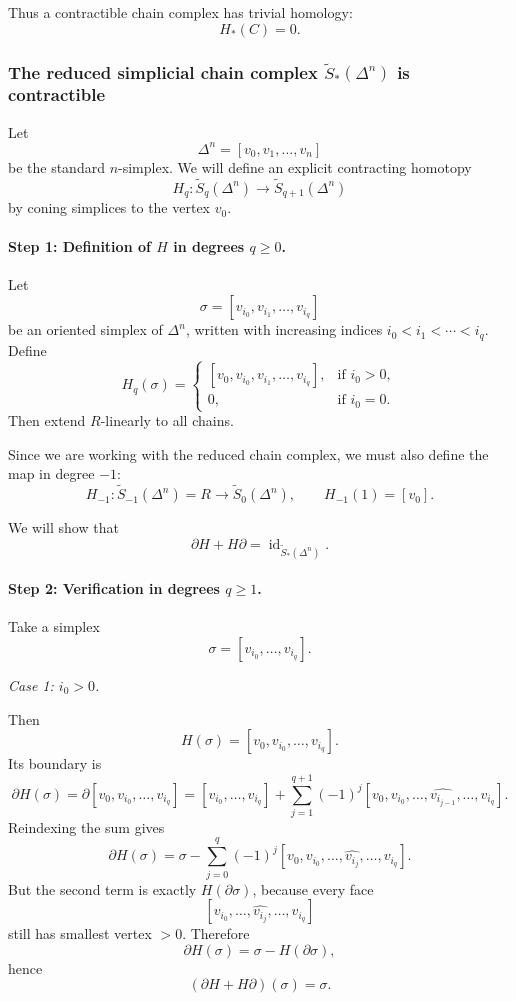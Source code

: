 \documentclass[12pt,a4paper]{article}
\theoremstyle{notespace}
\begin{document}
Thus a contractible chain complex has trivial homology:
\[
H_*(C)=0.
\]

\subsubsection{The reduced simplicial chain complex \(\widetilde{S}_*(\Delta^n)\) is contractible}

Let
\[
\Delta^n=[v_0,v_1,\dots,v_n]
\]
be the standard \(n\)-simplex. We will define an explicit contracting homotopy
\[
H_q : \widetilde{S}_q(\Delta^n)\to \widetilde{S}_{q+1}(\Delta^n)
\]
by coning simplices to the vertex \(v_0\).

\paragraph{Step 1: Definition of \(H\) in degrees \(q\ge 0\).}

Let
\[
\sigma=[v_{i_0},v_{i_1},\dots,v_{i_q}]
\]
be an oriented simplex of \(\Delta^n\), written with increasing indices \(i_0<i_1<\cdots<i_q\). Define
\[
H_q(\sigma)=
\begin{cases}
	[v_0,v_{i_0},v_{i_1},\dots,v_{i_q}], & \text{if } i_0>0,\\[1mm]
	0, & \text{if } i_0=0.
\end{cases}
\]
Then extend \(R\)-linearly to all chains.

Since we are working with the reduced chain complex, we must also define the map in degree \(-1\):
\[
H_{-1}: \widetilde{S}_{-1}(\Delta^n)=R \longrightarrow \widetilde{S}_0(\Delta^n),
\qquad
H_{-1}(1)=[v_0].
\]

We will show that
\[
\partial H + H\partial=\operatorname{id}_{\widetilde{S}_*(\Delta^n)}.
\]

\paragraph{Step 2: Verification in degrees \(q\ge 1\).}

Take a simplex
\[
\sigma=[v_{i_0},\dots,v_{i_q}].
\]

\medskip

\noindent
\emph{Case 1: \(i_0>0\).}

Then
\[
H(\sigma)=[v_0,v_{i_0},\dots,v_{i_q}].
\]
Its boundary is
\[
\partial H(\sigma)
=
\partial [v_0,v_{i_0},\dots,v_{i_q}]
=
[v_{i_0},\dots,v_{i_q}]
+
\sum_{j=1}^{q+1}(-1)^j
[v_0,v_{i_0},\dots,\widehat{v_{i_{j-1}}},\dots,v_{i_q}].
\]
Reindexing the sum gives
\[
\partial H(\sigma)
=
\sigma
-
\sum_{j=0}^{q}(-1)^j
[v_0,v_{i_0},\dots,\widehat{v_{i_j}},\dots,v_{i_q}].
\]
But the second term is exactly \(H(\partial \sigma)\), because every face
\[
[v_{i_0},\dots,\widehat{v_{i_j}},\dots,v_{i_q}]
\]
still has smallest vertex \(>0\). Therefore
\[
\partial H(\sigma)=\sigma-H(\partial \sigma),
\]
hence
\[
(\partial H+H\partial)(\sigma)=\sigma.
\]
\end{document}
